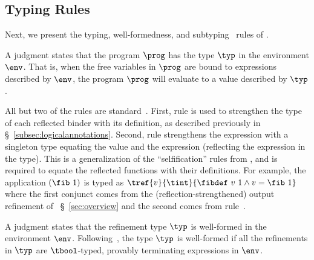 \subsection{Typing Rules}

%
Next, we present the
typing, well-formedness, and subtyping~\citep{Knowles10,Vazou14}
rules of \corelan.

A judgment \hastype{\env}{\prog}{\typ} states that
the program $\prog$ has the type $\typ$ in
the environment $\env$.
That is, when the free variables in $\prog$ are
bound to expressions described by $\env$, the
program $\prog$ will evaluate to a value
described by $\typ$.

%
All but two of the rules are standard~\cite{Knowles10,Vazou14}.
%
First, rule \rtreflect is used to strengthen the type of each
reflected binder with its definition, as described previously
in \S~\ref{subsec:logicalannotations}.
%
Second, rule \rtexact strengthens the expression with
a singleton type equating the value and the expression
(\ie reflecting the expression in the type).
%
This is a generalization of the ``selfification'' rules
from \cite{Ou2004,Knowles10}, and is required to
equate the reflected functions with their definitions.
%
For example, the application $(\fib\ 1)$ is typed as
${\tref{v}{\tint}{\fibdef\ v\ 1 \wedge v = \fib\ 1}}$ where
the first conjunct comes from the (reflection-strengthened)
output refinement of \fib~\S~\ref{sec:overview} and
the second comes from rule~\rtexact.
%


A judgment \iswellformed{\env}{\typ} states that
the refinement type $\typ$ is well-formed in
the environment $\env$.
%
Following~\citep{Vazou14}, the type $\typ$ is well-formed if all
the refinements in $\typ$ are $\tbool$-typed,
provably terminating expressions in $\env$.
%

